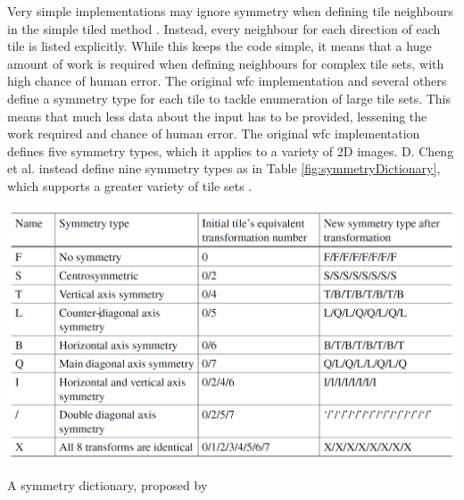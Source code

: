 Very simple implementations may ignore symmetry when defining tile neighbours in the simple tiled method \cite{Easy_WFC}. Instead, every neighbour for each direction of each tile is listed explicitly. While this keeps the code simple, it means that a huge amount of work is required when defining neighbours for complex tile sets, with high chance of human error. The original \acrshort{wfc} implementation and several others define a symmetry type for each tile to tackle enumeration of large tile sets. This means that much less data about the input has to be provided, lessening the work required and chance of human error. The original \acrshort{wfc} implementation defines five symmetry types, which it applies to a variety of 2D images. D. Cheng et al. instead define nine symmetry types as in Table \ref{fig:symmetryDictionary}, which supports a greater variety of tile sets \cite{WFC_Automatic_Rules_And_Better_Symmetries}.

\begin{table}[H]
    \centering
    \includegraphics[width=\textwidth, height=0.3\textheight, keepaspectratio]{Images/SymmetryDictionary.png}
    \caption{A symmetry dictionary, proposed by \cite{WFC_Automatic_Rules_And_Better_Symmetries}}
    \label{fig:symmetryDictionary}
\end{table}

